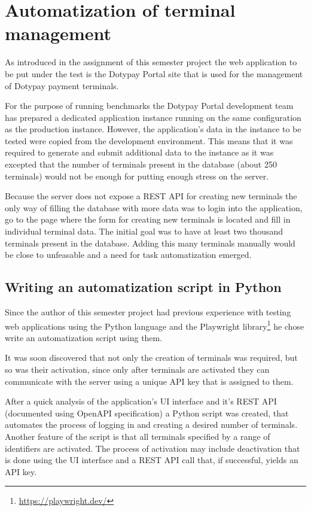 \documentclass[12pt, a4paper]{article}
\let\oldsection\section
\renewcommand\section{\clearpage\oldsection}
\begin{document}
\section{Automatization of terminal management}

As introduced in the assignment of this semester project the web application to be put under the test is the Dotypay Portal site that is used for the management of Dotypay payment terminals.

For the purpose of running benchmarks the Dotypay Portal development team has prepared a dedicated application instance running on the same configuration as the production instance.
However, the application's data in the instance to be tested were copied from the development environment.
This means that it was required to generate and submit additional data to the instance as it was excepted that the number of terminals present in the database (about 250 terminals)  would not be enough for putting enough stress on the server.

Because the server does not expose a REST API for creating new terminals the only way of filling the database with more data was to login into the application, go to the page where the form for creating new terminals is located and fill in individual terminal data. 
The initial goal was to have at least two thousand terminals present in the database.
Adding this many terminals manually would be close to unfeasable and a need for task automatization emerged.


\subsection{Writing an automatization script in Python}

Since the author of this semester project had previous experience with testing web applications using the Python language and the Playwright library\footnote{\url{https://playwright.dev/}} he chose write an automatization script using them.

It was soon discovered that not only the creation of terminals was required, but so was their activation, since only after terminals are activated they can communicate with the server using a unique API key that is assigned to them.

After a quick analysis of the application's UI interface and it's REST API (documented using OpenAPI specification) a Python script was created, that automates the process of logging in and creating a desired number of terminals.
Another feature of the script is that all terminals specified by a range of identifiers are activated.
The process of activation may include deactivation that is done using the UI interface and a REST API call that, if successful, yields an API key.
\end{document}
